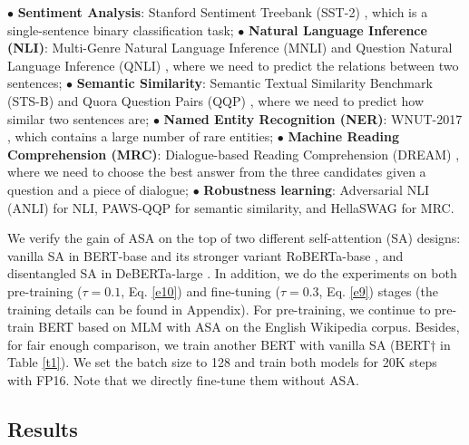 \documentclass[letterpaper]{article} \usepackage{aaai23}  \usepackage{times}  \usepackage{helvet}  \usepackage{courier}  \usepackage[hyphens]{url}  \usepackage{graphicx} \urlstyle{rm} \def\UrlFont{\rm}  \usepackage{natbib}  \usepackage{caption} \frenchspacing  \setlength{\pdfpagewidth}{8.5in}  \setlength{\pdfpageheight}{11in}  \usepackage{algorithm}
\begin{document}
$\bullet$ \textbf{Sentiment Analysis}: Stanford Sentiment Treebank (SST-2) \citep{DBLP:conf/emnlp/SocherPWCMNP13}, which is a single-sentence binary classification task;
$\bullet$ \textbf{Natural Language Inference (NLI)}: Multi-Genre Natural Language Inference (MNLI) \citep{DBLP:conf/naacl/WilliamsNB18} and Question Natural Language Inference (QNLI) \citep{DBLP:conf/iclr/WangSMHLB19}, where we need to predict the relations between two sentences;
$\bullet$ \textbf{Semantic Similarity}: Semantic Textual Similarity Benchmark (STS-B) \citep{DBLP:conf/semeval/CerDALS17} and Quora Question Pairs (QQP) \citep{DBLP:conf/iclr/WangSMHLB19}, where we need to predict how similar two sentences are;
$\bullet$ \textbf{Named Entity Recognition (NER)}: WNUT-2017 \citep{DBLP:conf/aclnut/AguilarMLS17}, which contains a large number of rare entities;
$\bullet$ \textbf{Machine Reading Comprehension (MRC)}: Dialogue-based Reading Comprehension (DREAM) \citep{DBLP:journals/tacl/SunYCYCC19}, where we need to choose the best answer from the three candidates given a question and a piece of dialogue;
$\bullet$ \textbf{Robustness learning}: Adversarial NLI (ANLI) \citep{DBLP:conf/acl/NieWDBWK20} for NLI, PAWS-QQP \citep{DBLP:conf/naacl/ZhangBH19} for semantic similarity, and HellaSWAG \citep{DBLP:conf/acl/ZellersHBFC19} for MRC.

We verify the gain of ASA on the top of two different self-attention (SA) designs: vanilla SA in BERT-base \citep{DBLP:conf/naacl/DevlinCLT19} and its stronger variant RoBERTa-base \citep{DBLP:journals/corr/abs-1907-11692}, and disentangled SA in DeBERTa-large \citep{DBLP:conf/iclr/HeLGC21}. In addition, we do the experiments on both pre-training ($ \tau = 0.1 $, Eq. \ref{e10}) and fine-tuning ($ \tau = 0.3 $, Eq. \ref{e9}) stages (the training details can be found in Appendix). For pre-training, we continue to pre-train BERT based on MLM with ASA on the English Wikipedia corpus. Besides, for fair enough comparison, we train another BERT with vanilla SA (BERT$\dagger$ in Table \ref{t1}). We set the batch size to 128 and train both models for 20K steps with FP16. Note that we directly fine-tune them without ASA.

\subsection{Results}
\end{document}
